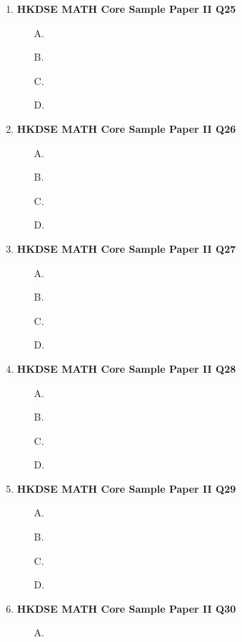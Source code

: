 \documentclass[12pt]{article}
\begin{document}
\begin{enumerate}
\begin{enumerate}
		\item[D.]
	\end{enumerate}
	\item \textbf{HKDSE MATH Core Sample Paper II Q25}\\
	\begin{enumerate}
		\item[A.]
		\item[B.]
		\item[C.]
		\item[D.]
	\end{enumerate}
	\item \textbf{HKDSE MATH Core Sample Paper II Q26}\\
	\begin{enumerate}
		\item[A.]
		\item[B.]
		\item[C.]
		\item[D.]
	\end{enumerate}
	\item \textbf{HKDSE MATH Core Sample Paper II Q27}\\
	\begin{enumerate}
		\item[A.]
		\item[B.]
		\item[C.]
		\item[D.]
	\end{enumerate}
	\item \textbf{HKDSE MATH Core Sample Paper II Q28}\\
	\begin{enumerate}
		\item[A.]
		\item[B.]
		\item[C.]
		\item[D.]
	\end{enumerate}
	\item \textbf{HKDSE MATH Core Sample Paper II Q29}\\
	\begin{enumerate}
		\item[A.]
		\item[B.]
		\item[C.]
		\item[D.]
	\end{enumerate}
	\item \textbf{HKDSE MATH Core Sample Paper II Q30}\\
	\begin{enumerate}
		\item[A.]

\end{enumerate}
\end{enumerate}
\end{document}
